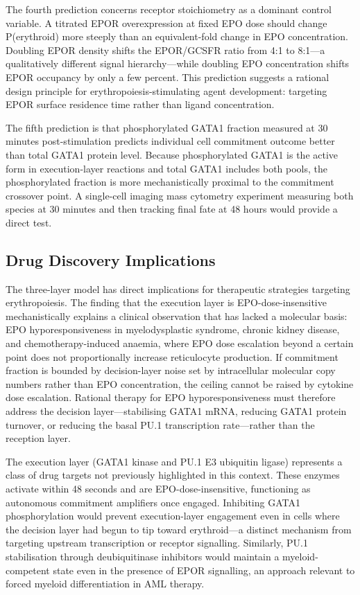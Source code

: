 The fourth prediction concerns receptor stoichiometry as a dominant control
variable. A titrated EPOR overexpression at fixed EPO dose should change
P(erythroid) more steeply than an equivalent-fold change in EPO concentration.
Doubling EPOR density shifts the EPOR/GCSFR ratio from 4:1 to 8:1---a
qualitatively different signal hierarchy---while doubling EPO concentration shifts
EPOR occupancy by only a few percent. This prediction suggests a rational design
principle for erythropoiesis-stimulating agent development: targeting EPOR
surface residence time rather than ligand concentration.

The fifth prediction is that phosphorylated GATA1 fraction measured at 30 minutes
post-stimulation predicts individual cell commitment outcome better than total
GATA1 protein level. Because phosphorylated GATA1 is the active form in
execution-layer reactions and total GATA1 includes both pools, the phosphorylated
fraction is more mechanistically proximal to the commitment crossover point. A single-cell
imaging mass cytometry experiment measuring both species at 30 minutes and then
tracking final fate at 48 hours would provide a direct test.

\subsection{Drug Discovery Implications}

The three-layer model has direct implications for therapeutic strategies targeting
erythropoiesis. The finding that the execution layer is EPO-dose-insensitive
mechanistically explains a clinical observation that has lacked a molecular basis:
EPO hyporesponsiveness in myelodysplastic syndrome, chronic kidney disease, and
chemotherapy-induced anaemia, where EPO dose escalation beyond a certain point
does not proportionally increase reticulocyte production. If commitment fraction
is bounded by decision-layer noise set by intracellular molecular copy numbers
rather than EPO concentration, the ceiling cannot be raised by cytokine dose
escalation. Rational therapy for EPO hyporesponsiveness must therefore address
the decision layer---stabilising GATA1 mRNA, reducing GATA1 protein turnover, or
reducing the basal PU.1 transcription rate---rather than the reception layer.

The execution layer (GATA1 kinase and PU.1 E3 ubiquitin ligase) represents a
class of drug targets not previously highlighted in this context. These enzymes
activate within 48 seconds and are EPO-dose-insensitive, functioning as
autonomous commitment amplifiers once engaged. Inhibiting GATA1 phosphorylation
would prevent execution-layer engagement even in cells where the decision layer
had begun to tip toward erythroid---a distinct mechanism from targeting upstream
transcription or receptor signalling. Similarly, PU.1 stabilisation through
deubiquitinase inhibitors would maintain a myeloid-competent state even in the
presence of EPOR signalling, an approach relevant to forced myeloid
differentiation in AML therapy.

